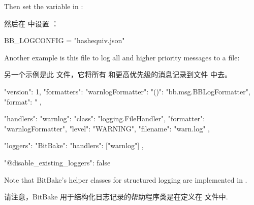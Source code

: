 Then set the  variable in :

然后在  中设置  ：

\begin{pyglist}
BB_LOGCONFIG = "hashequiv.json"
\end{pyglist}

Another example is this  file to log all  and higher priority messages to a  file:

另一个示例是此  文件，它将所有  和更高优先级的消息记录到文件  中去。

\begin{pyglist}
{
    "version": 1,
    "formatters": {
        "warnlogFormatter": {
            "()": "bb.msg.BBLogFormatter",
            "format": "%
        }
    },

    "handlers": {
        "warnlog": {
            "class": "logging.FileHandler",
            "formatter": "warnlogFormatter",
            "level": "WARNING",
            "filename": "warn.log"
        }
    },

    "loggers": {
        "BitBake": {
            "handlers": ["warnlog"]
        }
    },

    "@disable_existing_loggers": false
}
\end{pyglist}

Note that BitBake's helper classes for structured logging are implemented in .

请注意，BitBake 用于结构化日志记录的帮助程序类是在定义在  文件中.

